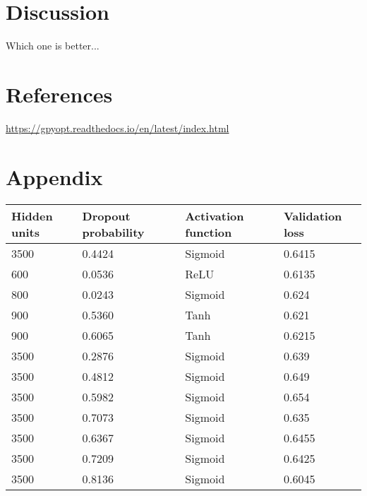 \documentclass[12pt,fleqn]{article}
\begin{document}
\section{Discussion}
Which one is better... 

\section{References}
\url{https://gpyopt.readthedocs.io/en/latest/index.html}
 
 
\section{Appendix}
\begin{table}[H]
	\begin{tabular}{|l|l|l|l|}
		\hline
		Hidden units & Dropout probability & Activation function & Validation loss \\ \hline
		3500         & 0.4424              & Sigmoid             & 0.6415          \\ \hline
		600          & 0.0536              & ReLU                & 0.6135          \\ \hline
		800          & 0.0243              & Sigmoid             & 0.624           \\ \hline
		900          & 0.5360              & Tanh                & 0.621           \\ \hline
		900          & 0.6065              & Tanh                & 0.6215          \\ \hline
		3500         & 0.2876              & Sigmoid             & 0.639           \\ \hline
		3500         & 0.4812              & Sigmoid             & 0.649           \\ \hline
		3500         & 0.5982              & Sigmoid             & 0.654           \\ \hline
		3500         & 0.7073              & Sigmoid             & 0.635           \\ \hline
		3500         & 0.6367              & Sigmoid             & 0.6455          \\ \hline
		3500         & 0.7209              & Sigmoid             & 0.6425          \\ \hline
		3500         & 0.8136              & Sigmoid             & 0.6045          \\ \hline
	\end{tabular}
\end{table}
\end{document}
